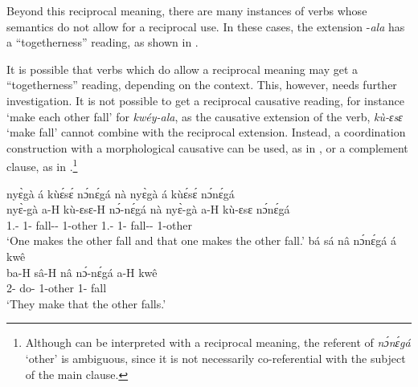 Beyond this reciprocal meaning, there are many instances of verbs whose semantics do not allow for a reciprocal use. In these cases, the extension -{\itshape ala} has a ``togetherness'' reading, as shown in .


It is possible that verbs which do allow a reciprocal meaning may get a ``togetherness'' reading, depending on the context. This, however, needs further investigation. 
It is not possible to get a reciprocal causative reading, for instance `make each other fall' for {\itshape kwéy-ala}, as the causative extension of the verb, {\itshape kù-ɛsɛ} `make fall' cannot combine with the reciprocal extension. Instead, a coordination construction with a morphological causative can be used, as in , or a complement clause, as in .\footnote{Although  can be interpreted with a reciprocal meaning, the referent of {\itshape nɔ́nɛ́gá} `other' is ambiguous, since it is not necessarily co-referential with the subject of the main clause.} 

\ea \label{CAUSx}
  \ea  \label{CAUSx1}
  \glll nyɛ̀gà á kùɛ́sɛ́ nɔ́nɛ́gá nà nyɛ̀gà á kùɛ́sɛ́ nɔ́nɛ́gá \\
   nyɛ̀-gà a-H kù-ɛsɛ-H nɔ́-nɛ́gá nà nyɛ̀-gà a-H kù-ɛsɛ nɔ́nɛ́gá \\
    1.{\SBJ}-{\CONTR} 1-{\PRS} fall-{\CAUS}-{\R} 1-other {\CONJ} 1.{\SBJ}-{\CONTR} 1-{\PRS} fall-{\CAUS}-{\R} 1-other\\
   \trans `One makes the other fall and that one makes the other fall.'
\ex\label{CAUSx2}
 \glll bá sá nâ nɔ́nɛ́gá á kwê \\
      ba-H sâ-H nâ nɔ́-nɛ́gá a-H kwê \\
     2-{\PRS} do-{\R} {\COMP} 1-other 1-{\PRS} fall \\
    \trans `They make that the other falls.'
\z
\z




